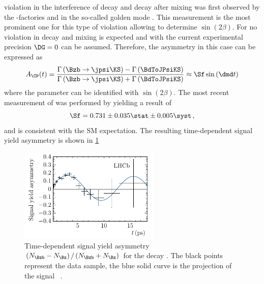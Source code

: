 \CP violation in the interference of decay and decay after mixing was first observed by the \B-factories \babar \cite{Aubert:2001nu} and \belle \cite{Abe:2001xe} in the so-called golden mode \BdToJPsiKS.
This measurement is the most prominent one for this type of \CP violation allowing to determine $\sin\!\left(2\beta\right)$.
For \BdToJPsiKS no \CP violation in decay and mixing is expected and with the current experimental precision $\DG=0$ can be assumed.
Therefore, the \CP asymmetry in this case can be expressed as
\begin{equation}
A_{\CP}(t)=\frac{\Gamma\left(\Bzb\to\jpsi\KS\right)-\Gamma\left(\BdToJPsiKS\right)}{\Gamma\left(\Bzb\to\jpsi\KS\right)+\Gamma\left(\BdToJPsiKS\right)}\approx\Sf\sin\left(\dmd t\right)\label{eq:CPAsymBd2JpsiKS}
\end{equation}
where the parameter \Sf can be identified with $\sin\!\left(2\beta\right)$.
The most recent measurement of \Sf was performed by \lhcb \cite{Aaij:2015vza} yielding a result of
\begin{equation}
\Sf=0.731\pm0.035\stat\pm0.005\syst\,,
\end{equation}
and is consistent with the \ac{SM} expectation. The resulting time-dependent signal yield asymmetry is shown in \cref{fig:sin2beta}
\begin{figure}[tb]
	\centering
	\includegraphics[width=0.6\textwidth]{03CPV/figs/InterferenceCPV.pdf}
	\caption{Time-dependent signal yield asymmetry $\left(N_{\Bzb}-N_{\Bz}\right)/\left(N_{\Bzb}+N_{\Bz}\right)$ for the decay \BdToJPsiKS.
	The black points represent the data sample, the blue solid curve is the projection of the signal \PDF~\cite{Aaij:2015vza}.}
	\label{fig:sin2beta}
\end{figure}
